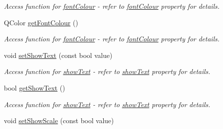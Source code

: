 \begin{DoxyCompactItemize}
\begin{DoxyCompactList}\small\item\em Access function for \hyperlink{classQEAnalogIndicator_aa469d827ef97d89741a1eacf37c10086}{fontColour} -\/ refer to \hyperlink{classQEAnalogIndicator_aa469d827ef97d89741a1eacf37c10086}{fontColour} property for details. \end{DoxyCompactList}\item 
\hypertarget{classQEAnalogIndicator_acd403eed6ee973de59b57b13f922103f}{
QColor \hyperlink{classQEAnalogIndicator_acd403eed6ee973de59b57b13f922103f}{getFontColour} ()}
\label{classQEAnalogIndicator_acd403eed6ee973de59b57b13f922103f}

\begin{DoxyCompactList}\small\item\em Access function for \hyperlink{classQEAnalogIndicator_aa469d827ef97d89741a1eacf37c10086}{fontColour} -\/ refer to \hyperlink{classQEAnalogIndicator_aa469d827ef97d89741a1eacf37c10086}{fontColour} property for details. \end{DoxyCompactList}\item 
\hypertarget{classQEAnalogIndicator_a41a2417b02c1e6e963e87ff423b1d655}{
void \hyperlink{classQEAnalogIndicator_a41a2417b02c1e6e963e87ff423b1d655}{setShowText} (const bool value)}
\label{classQEAnalogIndicator_a41a2417b02c1e6e963e87ff423b1d655}

\begin{DoxyCompactList}\small\item\em Access function for \hyperlink{classQEAnalogIndicator_af21560a34b89683bbf1d86733522a684}{showText} -\/ refer to \hyperlink{classQEAnalogIndicator_af21560a34b89683bbf1d86733522a684}{showText} property for details. \end{DoxyCompactList}\item 
\hypertarget{classQEAnalogIndicator_af47a08a8e51dc9baaf47fc438c7d534a}{
bool \hyperlink{classQEAnalogIndicator_af47a08a8e51dc9baaf47fc438c7d534a}{getShowText} ()}
\label{classQEAnalogIndicator_af47a08a8e51dc9baaf47fc438c7d534a}

\begin{DoxyCompactList}\small\item\em Access function for \hyperlink{classQEAnalogIndicator_af21560a34b89683bbf1d86733522a684}{showText} -\/ refer to \hyperlink{classQEAnalogIndicator_af21560a34b89683bbf1d86733522a684}{showText} property for details. \end{DoxyCompactList}\item 
\hypertarget{classQEAnalogIndicator_a94347fb9b9c9602925300cfbeda10f0b}{
void \hyperlink{classQEAnalogIndicator_a94347fb9b9c9602925300cfbeda10f0b}{setShowScale} (const bool value)}
\label{classQEAnalogIndicator_a94347fb9b9c9602925300cfbeda10f0b}


\end{DoxyCompactItemize}
